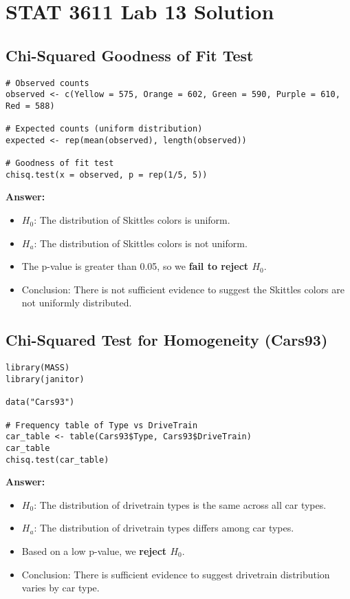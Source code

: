 \documentclass{article}
\begin{document}
\section*{STAT 3611 Lab 13 Solution}
\subsection*{Chi-Squared Goodness of Fit Test}

\begin{lstlisting}
# Observed counts
observed <- c(Yellow = 575, Orange = 602, Green = 590, Purple = 610, Red = 588)

# Expected counts (uniform distribution)
expected <- rep(mean(observed), length(observed))

# Goodness of fit test
chisq.test(x = observed, p = rep(1/5, 5))
\end{lstlisting}

\textbf{Answer:}  
\begin{itemize}
    \item $H_0$: The distribution of Skittles colors is uniform.
    \item $H_a$: The distribution of Skittles colors is not uniform.
    \item The p-value is greater than 0.05, so we \textbf{fail to reject $H_0$}.
    \item Conclusion: There is not sufficient evidence to suggest the Skittles colors are not uniformly distributed.
\end{itemize}

\subsection*{Chi-Squared Test for Homogeneity (Cars93)}

\begin{lstlisting}
library(MASS)
library(janitor)

data("Cars93")

# Frequency table of Type vs DriveTrain
car_table <- table(Cars93$Type, Cars93$DriveTrain)
car_table
chisq.test(car_table)
\end{lstlisting}

\textbf{Answer:}  
\begin{itemize}
    \item $H_0$: The distribution of drivetrain types is the same across all car types.
    \item $H_a$: The distribution of drivetrain types differs among car types.
    \item Based on a low p-value, we \textbf{reject $H_0$}.
    \item Conclusion: There is sufficient evidence to suggest drivetrain distribution varies by car type.
\end{itemize}
\end{document}
